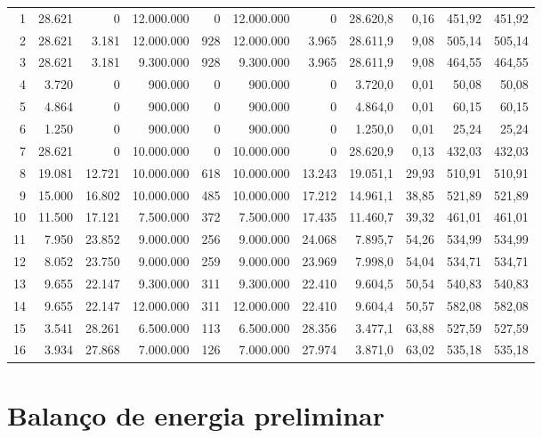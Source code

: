\documentclass[11pt,a4paper]{article}
\numberwithin{equation}{section}
\numberwithin{table}{section}
\numberwithin{figure}{section}
\begin{document}
\begin{landscape}
\begin{longtable}{rrrrrrrrrrr}
1 & 28.621 & 0 & 12.000.000 & 0 & 12.000.000 & 0 & 28.620,8 & 0,16 & 451,92 & 451,92\\
2 & 28.621 & 3.181 & 12.000.000 & 928 & 12.000.000 & 3.965 & 28.611,9 & 9,08 & 505,14 & 505,14\\
3 & 28.621 & 3.181 & 9.300.000 & 928 & 9.300.000 & 3.965 & 28.611,9 & 9,08 & 464,55 & 464,55\\
4 & 3.720 & 0 & 900.000 & 0 & 900.000 & 0 & 3.720,0 & 0,01 & 50,08 & 50,08\\
5 & 4.864 & 0 & 900.000 & 0 & 900.000 & 0 & 4.864,0 & 0,01 & 60,15 & 60,15\\
6 & 1.250 & 0 & 900.000 & 0 & 900.000 & 0 & 1.250,0 & 0,01 & 25,24 & 25,24\\
7 & 28.621 & 0 & 10.000.000 & 0 & 10.000.000 & 0 & 28.620,9 & 0,13 & 432,03 & 432,03\\
8 & 19.081 & 12.721 & 10.000.000 & 618 & 10.000.000 & 13.243 & 19.051,1 & 29,93 & 510,91 & 510,91\\
9 & 15.000 & 16.802 & 10.000.000 & 485 & 10.000.000 & 17.212 & 14.961,1 & 38,85 & 521,89 & 521,89\\
10 & 11.500 & 17.121 & 7.500.000 & 372 & 7.500.000 & 17.435 & 11.460,7 & 39,32 & 461,01 & 461,01\\
11 & 7.950 & 23.852 & 9.000.000 & 256 & 9.000.000 & 24.068 & 7.895,7 & 54,26 & 534,99 & 534,99\\
12 & 8.052 & 23.750 & 9.000.000 & 259 & 9.000.000 & 23.969 & 7.998,0 & 54,04 & 534,71 & 534,71\\
13 & 9.655 & 22.147 & 9.300.000 & 311 & 9.300.000 & 22.410 & 9.604,5 & 50,54 & 540,83 & 540,83\\
14 & 9.655 & 22.147 & 12.000.000 & 311 & 12.000.000 & 22.410 & 9.604,4 & 50,57 & 582,08 & 582,08\\
15 & 3.541 & 28.261 & 6.500.000 & 113 & 6.500.000 & 28.356 & 3.477,1 & 63,88 & 527,59 & 527,59\\
16 & 3.934 & 27.868 & 7.000.000 & 126 & 7.000.000 & 27.974 & 3.871,0 & 63,02 & 535,18 & 535,18\\
\bottomrule\end{longtable}
\end{landscape}

\section{Balanço de energia preliminar}\label{sec:energia}
\end{document}

